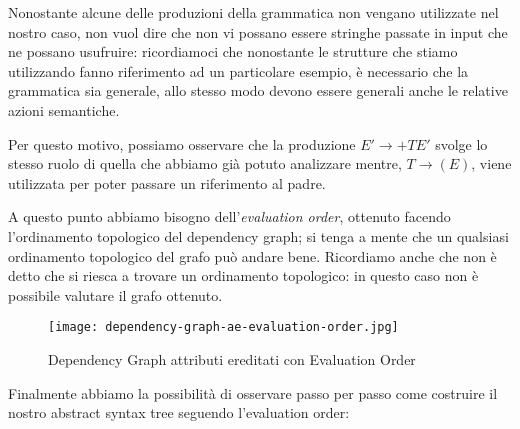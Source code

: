 \documentclass[class=book, crop=false, oneside, 12pt]{standalone}
\begin{document}
Nonostante alcune delle produzioni della grammatica non vengano utilizzate nel nostro caso, non vuol dire che non vi possano essere stringhe passate in input che ne possano usufruire: ricordiamoci che nonostante le strutture che stiamo utilizzando fanno riferimento ad un particolare esempio, è necessario che la grammatica sia generale, allo stesso modo devono essere generali anche le relative azioni semantiche.

Per questo motivo, possiamo osservare che la produzione \(E' \to +TE'\) svolge lo stesso ruolo di quella che abbiamo già potuto analizzare mentre, \(T \to (E)\), viene utilizzata per poter passare un riferimento al padre. 

A questo punto abbiamo bisogno dell'\emph{evaluation order}, ottenuto facendo l'ordinamento topologico del dependency graph; si tenga a mente che un qualsiasi ordinamento topologico del grafo può andare bene. Ricordiamo anche che non è detto che si riesca a trovare un ordinamento topologico: in questo caso non è possibile valutare il grafo ottenuto.

\begin{figure}[H]
	\centering
    \texttt{[image: dependency-graph-ae-evaluation-order.jpg]}
    \caption{Dependency Graph attributi ereditati con Evaluation Order}
    \label{fig:dependency-graph-ae-evaluation-order}
\end{figure}

Finalmente abbiamo la possibilità di osservare passo per passo come costruire il nostro abstract syntax tree seguendo l'evaluation order:
\end{document}
